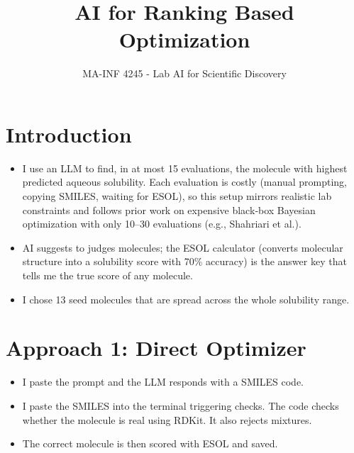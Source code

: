 \documentclass[11pt,a4paper]{article}
\title{AI for Ranking Based Optimization}
\author{MA-INF 4245 - Lab AI for Scientific Discovery}
\date{}  %
\begin{document}
\maketitle

\section{Introduction}
\begin{itemize}
    \item I use an LLM to find, in at most 15 evaluations, the molecule with highest predicted aqueous solubility. Each evaluation is costly (manual prompting, copying SMILES, waiting for ESOL), so this setup mirrors realistic lab constraints and follows prior work on expensive black‑box Bayesian optimization with only 10–30 evaluations (e.g., Shahriari et al.).
    \item AI suggests to judges molecules; the ESOL calculator (converts molecular structure into a solubility score with 70\% accuracy) is the answer key that tells me the true score of any molecule. 
    \item I chose 13 seed molecules that are spread across the whole solubility range. 
\end{itemize}

\section{Approach 1: Direct Optimizer}
\begin{itemize}
    \item I paste the prompt and the LLM responds with a SMILES code.
    \item I paste the SMILES into the terminal triggering checks. The code checks whether the molecule is real using RDKit. It also rejects mixtures.
    \item The correct molecule is then scored with ESOL and saved.
\end{itemize}
\end{document}
